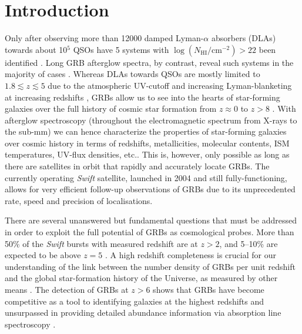 
\section{Introduction}

Only after observing more than 12000 damped Lyman-$\alpha$ absorbers (DLAs)
towards about 10$^5$ QSOs have 5 systems with
$\log({N_\mathrm{HI}/\mathrm{cm^{-2}}}) > 22$ been identified
\citep{Noterdaeme2012}. Long GRB afterglow spectra, by contrast, reveal such
systems in the majority of cases \citep{Jakobsson2006, Fynbo2009}. Whereas DLAs
towards QSOs are mostly limited to $1.8\lesssim z \lesssim 5$ due to the
atmospheric  UV-cutoff and increasing Lyman-blanketing at increasing redshifts
\citep[e.g.,][]{Rafelski2014}, GRBs allow us to see into the hearts of
star-forming galaxies over the full history of cosmic star formation from $z
\approx 0$ to $z > 8$ \citep[e.g.,][]{Tanvir2009, Salvaterra2009,
	Jakobsson2012}. With afterglow spectroscopy (throughout the electromagnetic
spectrum from X-rays to the sub-mm) we can hence characterize the properties of
star-forming galaxies over cosmic history in terms of  redshifts, metallicities,
molecular contents, ISM temperatures, UV-flux densities, etc.. This is, however,
only possible as long as there are satellites in orbit that rapidly and
accurately locate GRBs. The currently operating \textit{Swift} satellite,
launched in 2004 and still fully-functioning, allows for very efficient
follow-up observations of GRBs due to its unprecedented rate, speed and
precision of localisations.

There are several unanswered but fundamental questions that must be addressed in
order to exploit the full potential of GRBs as cosmological probes. More than
50\% of the \textit{Swift} bursts with measured redshift are at $z > 2$, and 
5--10\% are expected to be above $z=5$ \citep{Salvaterra2007,
	Salvaterra2012,Jakobsson2012, Perley2016}. A high redshift completeness is
crucial for our understanding of the link between the number density of GRBs per
unit redshift and the global star-formation history of the Universe, as measured
by other means \citep[UV, FIR, sub-mm, see][]{Robertson2012}. The detection of
GRBs at $z > 6$ shows that GRBs have become competitive as a tool to identifying
galaxies at the highest redshifts and unsurpassed in providing detailed
abundance information via absorption line spectroscopy \citep{Tanvir2012,
	McGuire2016}.


